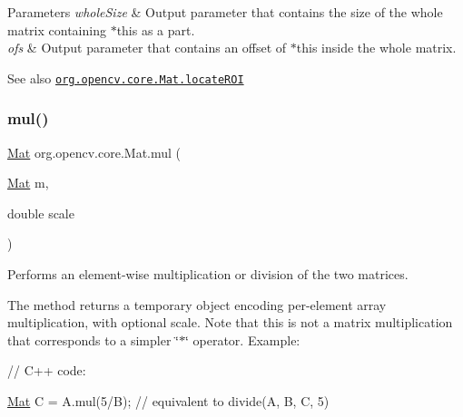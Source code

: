 \begin{DoxyParams}{Parameters}
{\em whole\+Size} & Output parameter that contains the size of the whole matrix containing {\ttfamily $\ast$this} as a part. \\
\hline
{\em ofs} & Output parameter that contains an offset of {\ttfamily $\ast$this} inside the whole matrix.\\
\hline
\end{DoxyParams}
\begin{DoxySeeAlso}{See also}
\href{http://docs.opencv.org/modules/core/doc/basic_structures.html#mat-locateroi}{\tt org.\+opencv.\+core.\+Mat.\+locate\+R\+OI} 
\end{DoxySeeAlso}
\mbox{\label{classorg_1_1opencv_1_1core_1_1_mat_a43e95787eea4de307230ceeb14bba8f6}} 
\subsubsection{\texorpdfstring{mul()}{mul()}\hspace{0.1cm}{\footnotesize\ttfamily [1/2]}}
{\footnotesize\ttfamily \mbox{\hyperlink{classorg_1_1opencv_1_1core_1_1_mat}{Mat}} org.\+opencv.\+core.\+Mat.\+mul (\begin{DoxyParamCaption}\item[{\mbox{\hyperlink{classorg_1_1opencv_1_1core_1_1_mat}{Mat}}}]{m,  }\item[{double}]{scale }\end{DoxyParamCaption})}

Performs an element-\/wise multiplication or division of the two matrices.

The method returns a temporary object encoding per-\/element array multiplication, with optional scale. Note that this is not a matrix multiplication that corresponds to a simpler \char`\"{}$\ast$\char`\"{} operator. Example\+: {\ttfamily }

{\ttfamily }

{\ttfamily }

{\ttfamily // C++ code\+:}

{\ttfamily }

{\ttfamily }

{\ttfamily \mbox{\hyperlink{classorg_1_1opencv_1_1core_1_1_mat}{Mat}} C = A.\+mul(5/B); // equivalent to divide(\+A, B, C, 5)}

